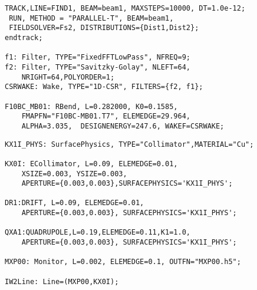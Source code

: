 \documentclass[xcolor=pdftex,table,10pt,yellow,mathserif]{beamer}
\begin{document}
\begin{frame}[fragile]
\begin{block}{}
\begin{verbatim}
TRACK,LINE=FIND1, BEAM=beam1, MAXSTEPS=10000, DT=1.0e-12;
 RUN, METHOD = "PARALLEL-T", BEAM=beam1, 
 FIELDSOLVER=Fs2, DISTRIBUTIONS={Dist1,Dist2};
endtrack;

f1: Filter, TYPE="FixedFFTLowPass", NFREQ=9;
f2: Filter, TYPE="Savitzky-Golay", NLEFT=64, 
	NRIGHT=64,POLYORDER=1;
CSRWAKE: Wake, TYPE="1D-CSR", FILTERS={f2, f1};

F10BC_MB01: RBend, L=0.282000, K0=0.1585,  
	FMAPFN="F10BC-MB01.T7", ELEMEDGE=29.964, 
	ALPHA=3.035,  DESIGNENERGY=247.6, WAKEF=CSRWAKE;
\end{verbatim}
\end{block}
\end{frame}


\begin{frame}[fragile]
\begin{block}{}
\begin{verbatim}
KX1I_PHYS: SurfacePhysics, TYPE="Collimator",MATERIAL="Cu";

KX0I: ECollimator, L=0.09, ELEMEDGE=0.01, 
	XSIZE=0.003, YSIZE=0.003, 
	APERTURE={0.003,0.003},SURFACEPHYSICS='KX1I_PHYS';

DR1:DRIFT, L=0.09, ELEMEDGE=0.01,
	APERTURE={0.003,0.003}, SURFACEPHYSICS='KX1I_PHYS';

QXA1:QUADRUPOLE,L=0.19,ELEMEDGE=0.11,K1=1.0,
	APERTURE={0.003,0.003}, SURFACEPHYSICS='KX1I_PHYS';

MXP00: Monitor, L=0.002, ELEMEDGE=0.1, OUTFN="MXP00.h5";

IW2Line: Line=(MXP00,KX0I);
\end{verbatim}
\end{block}
\end{frame}
\end{document}
